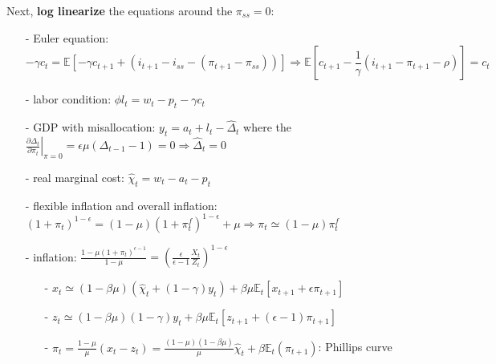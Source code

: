 \documentclass[10pt,landscape,a4paper]{article}
\begin{document}
\begin{multicols*}{3}
Next, \textbf{\color{myred}log linearize} the equations around the $\pi_{ss}=0$:
\begin{itemize}
    \item[-] Euler equation: 
    $$-\gamma c_t = \mathbb{E}\left[ -\gamma c_{t+1} + (i_{t+1}-i_{ss}-(\pi_{t+1}-\pi_{ss})) \right] \Rightarrow \mathbb{E}\left[c_{t+1}-\frac{1}{\gamma}(i_{t+1}-\pi_{t+1}-\rho)\right]= c_t$$
    \item[-] labor condition: $\phi l_t = w_t-p_t-\gamma c_t$
    \item[-] GDP with misallocation: $y_t=a_t+l_t-\hat{\Delta}_t$ where the $\left.\frac{\partial \Delta_t}{\partial \pi_t}\right\vert_{\pi=0} = \epsilon\mu(\Delta_{t-1}-1) =0 \Rightarrow \hat{\Delta}_t=0$
    \item[-] real marginal cost: $\hat{\chi}_t = w_t-a_t-p_t$
    \item[-] flexible inflation and overall inflation: $(1+\pi_t)^{1-\epsilon} = (1-\mu)(1+\pi_t^f)^{1-\epsilon}+\mu \Rightarrow \pi_t \simeq (1-\mu)\pi_t^f$
    \item[-] inflation: $\frac{1-\mu(1+\pi_t)^{\epsilon-1}}{1-\mu} = \left(\frac{\epsilon}{\epsilon-1}\frac{X_t}{Z_t}\right)^{1-\epsilon}$
    \begin{itemize}
        \item[-] $x_t \simeq (1-\beta\mu)\left(\hat{\chi}_t +(1-\gamma)y_t\right)+\beta\mu\mathbb{E}_t\left[x_{t+1}+\epsilon\pi_{t+1}\right]$
        \item[-] $z_t \simeq (1-\beta\mu)(1-\gamma)y_t +\beta\mu\mathbb{E}_t\left[z_{t+1}+(\epsilon-1)\pi_{t+1}\right]$
        \item[-] $\pi_t = \frac{1-\mu}{\mu}(x_t-z_t) = \frac{(1-\mu)(1-\beta\mu)}{\mu}\hat{\chi}_t+\beta\mathbb{E}_t(\pi_{t+1})$: Phillips curve
    \end{itemize}
\end{itemize}


\end{multicols*}
\end{document}
